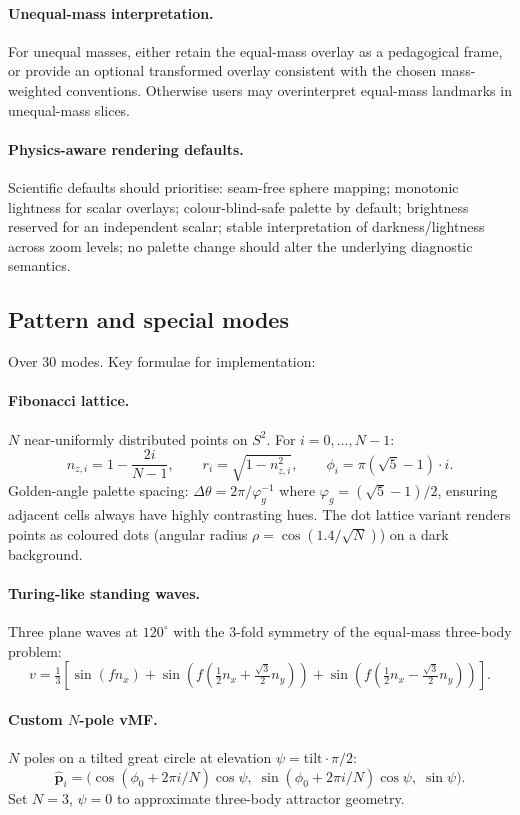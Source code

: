 \documentclass[11pt]{report}
\begin{document}
\paragraph{Unequal-mass interpretation.} For unequal masses, either retain the equal-mass overlay as a pedagogical frame, or provide an optional transformed overlay consistent with the chosen mass-weighted conventions. Otherwise users may overinterpret equal-mass landmarks in unequal-mass slices.

\paragraph{Physics-aware rendering defaults.} Scientific defaults should prioritise: seam-free sphere mapping; monotonic lightness for scalar overlays; colour-blind-safe palette by default; brightness reserved for an independent scalar; stable interpretation of darkness/lightness across zoom levels; no palette change should alter the underlying diagnostic semantics.

\subsection{Pattern and special modes}

Over 30 modes. Key formulae for implementation:

\paragraph{Fibonacci lattice.} $N$ near-uniformly distributed points on $S^2$. For $i=0,\ldots,N-1$:
\[
n_{z,i}=1-\frac{2i}{N-1},\qquad r_i=\sqrt{1-n_{z,i}^2},\qquad \phi_i=\pi(\sqrt5-1)\cdot i.
\]
Golden-angle palette spacing: $\Delta\theta=2\pi/\varphi_g^{-1}$ where $\varphi_g=(\sqrt5-1)/2$, ensuring adjacent cells always have highly contrasting hues. The dot lattice variant renders points as coloured dots (angular radius $\rho=\cos(1.4/\sqrt N)$) on a dark background.

\paragraph{Turing-like standing waves.} Three plane waves at $120^\circ$ with the 3-fold symmetry of the equal-mass three-body problem:
\[
v=\tfrac{1}{3}\!\left[\sin(fn_x)+\sin\!\left(f(\tfrac{1}{2}n_x+\tfrac{\sqrt3}{2}n_y)\right)+\sin\!\left(f(\tfrac{1}{2}n_x-\tfrac{\sqrt3}{2}n_y)\right)\right].
\]

\paragraph{Custom $N$-pole vMF.} $N$ poles on a tilted great circle at elevation $\psi=\mathrm{tilt}\cdot\pi/2$:
\[
\hat{\mathbf p}_i=\big(\cos(\phi_0+2\pi i/N)\cos\psi,\;\sin(\phi_0+2\pi i/N)\cos\psi,\;\sin\psi\big).
\]
Set $N=3$, $\psi=0$ to approximate three-body attractor geometry.
\end{document}

